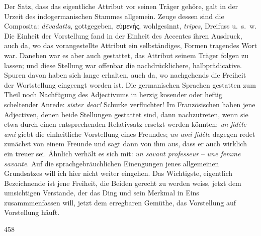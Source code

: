 Der Satz, dass das eigentliche Attribut vor seinen Träger gehöre, galt in der Urzeit des indogermanischen Stammes allgemein. Zeuge dessen sind die Composita: \textit{dēvadatta}, gottgegeben, εὐμενής, wohlgesinnt, \textit{tripes}, Dreifuss u.~s.~w. Die Einheit der Vorstellung fand in der Einheit des Accentes ihren Ausdruck, auch da, wo das vorangestellte Attribut ein selbständiges, Formen tragendes Wort war. Daneben war es aber auch gestattet, das Attribut seinem Träger folgen zu lassen; und diese Stellung war offenbar die nachdrücklichere, halbprädicative. Spuren davon haben sich lange erhalten, auch da, wo nachgehends die Freiheit der Wortstellung eingeengt worden ist. Die germanischen Sprachen gestatten zum Theil noch Nachfügung des Adjectivums in herzig kosender oder heftig scheltender Anrede: \textit{sister dear!} Schurke verfluchter! Im Französischen haben jene Adjectiven, denen beide Stellungen gestattet sind, dann nachzutreten, wenn sie etwa durch einen entsprechenden Relativsatz ersetzt werden könnten: \textit{un fidèle ami} giebt die einheitliche Vorstellung eines  Freundes; \textit{un ami fidèle} dagegen redet zunächst von einem Freunde und sagt dann von ihm aus, dass er auch wirklich ein  treuer sei. Ähnlich verhält es sich mit: \textit{un savant professeur} – \textit{une femme savante}. Auf die sprachgebräuchlichen Einengungen jenes allgemeinen Grundsatzes will ich hier nicht weiter eingehen. Das Wichtigste, eigentlich Bezeichnende ist jene Freiheit, die Beiden gerecht zu werden weiss, jetzt dem umsichtigen Verstande, der das Ding und sein \label{fp.438} Merkmal in Eins zusammmenfassen will, jetzt dem erregbaren Gemüthe, das Vorstellung auf Vorstellung häuft.

 {\textbar}{\textbar}458{\textbar}{\textbar}\label{sp.458} 

